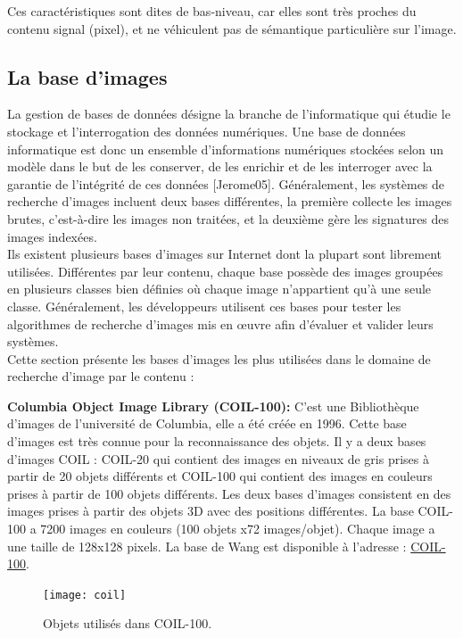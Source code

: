 Ces caractéristiques sont dites de bas-niveau, car elles sont très proches du contenu signal (pixel), et ne véhiculent pas de sémantique particulière sur l'image.\\


\subsection{La base d’images}
La gestion de bases de données désigne la branche de l’informatique qui étudie le stockage et l’interrogation des données numériques. Une base de données informatique est donc un ensemble d’informations numériques stockées selon un modèle dans le but de les conserver, de les enrichir et de les interroger avec la garantie de l’intégrité de ces données [Jerome05]. Généralement, les systèmes de recherche d’images incluent deux bases différentes, la première collecte les images brutes, c’est-à-dire les images non traitées, et la deuxième gère les signatures des images indexées.\\

Ils existent plusieurs bases d’images sur Internet dont la plupart sont librement utilisées. Différentes par leur contenu, chaque base possède des images groupées en plusieurs classes bien définies où chaque image  n’appartient qu’à une seule classe. Généralement, les développeurs utilisent ces bases pour tester les algorithmes de recherche d’images mis en œuvre afin d’évaluer et valider leurs systèmes.\\

Cette section présente les bases d’images les plus utilisées dans le domaine de recherche d’image par le contenu :


\textbf{Columbia Object Image Library (COIL-100):}
C’est une Bibliothèque d’images de l’université de Columbia, elle a été créée en 1996. Cette base d’images est très connue pour la reconnaissance des objets. Il y a deux bases d’images COIL : COIL-20 qui contient des images en niveaux de gris prises à partir de 20 objets différents et COIL-100 qui contient des images en couleurs prises à partir de 100 objets différents. Les deux bases d’images consistent en des images prises à partir des objets 3D avec des positions différentes. La base COIL-100 a 7200 images en couleurs (100 objets x72 images/objet). Chaque image a une taille de 128x128 pixels. La base de Wang est disponible à l’adresse : \href{https://www1.cs.columbia.edu/CAVE/software/softlib/coil-100.php}{COIL-100}.

\begin{figure}[H]
	\centering
	\texttt{[image: coil]} 
	\caption{Objets utilisés dans COIL-100.}
\end{figure}

